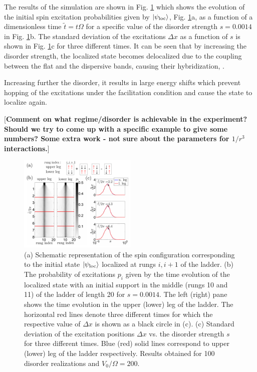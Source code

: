 \documentclass[prl,aps,twocolumn,showpacs,superscriptaddress,longbibliography]{revtex4-1}
\newcommand{\ran}{\right\rangle}
\newcommand{\ket}[1]{\left| #1 \ran}
\begin{document}
The results of the simulation are shown in Fig. \ref{Fig:time evolution} which shows the evolution of the initial spin excitation probabilities given by $\ket{\psi_{\rm loc}}$, Fig. \ref{Fig:time evolution}a, as a function of a dimensionless time $\tilde{t}=t \Omega$ for a specific value of the disorder strength $s=0.0014$ in Fig. \ref{Fig:time evolution}b. The standard deviation of the excitations $\Delta x$ as a function of $s$ is shown in Fig. \ref{Fig:time evolution}c for three different times. It can be seen that by increasing the disorder strength, the localized state becomes delocalized due to the coupling between the flat and the dispersive bands, causing their hybridization, \cite{Leykam2017}.

Increasing further the disorder, it results in large energy shifts which prevent hopping of the excitations under the facilitation condition and cause the state to localize again.

[{\bf Comment on what regime/disorder is achievable in the experiment? Should we try to come up with a specific example to give some numbers? Some extra work - not sure about the parameters for $1/r^3$ interactions.}]

\begin{figure}

	      \includegraphics[width=0.5\textwidth]{graphics/time_evolution_CLS_PaperSupport_v4.pdf}
		\caption{(a) Schematic representation of the spin configuration corresponding to the initial state $\ket{\psi_{\rm loc}}$ localized at rungs $i,i+1$ of the ladder. (b) The probability of excitations $p_i$ given by the time evolution of the localized state with an initial support in the middle (rungs 10 and 11) of the ladder of length 20 for $s=0.0014$. The left (right) pane shows the time evolution in the upper (lower) leg of the ladder. The horizontal red lines denote three different times for which the respective value of $\Delta x$ is shown as a black circle in (c). (c) Standard deviation of the excitation positions $\Delta x$ vs. the disorder strength $s$ for three different times. Blue (red) solid lines correspond to upper (lower) leg of the ladder respectively. Results obtained for 100 disorder realizations and $V_0/\Omega=200$.}

 \label{Fig:time evolution}
   
\end{figure}  
\end{document}
